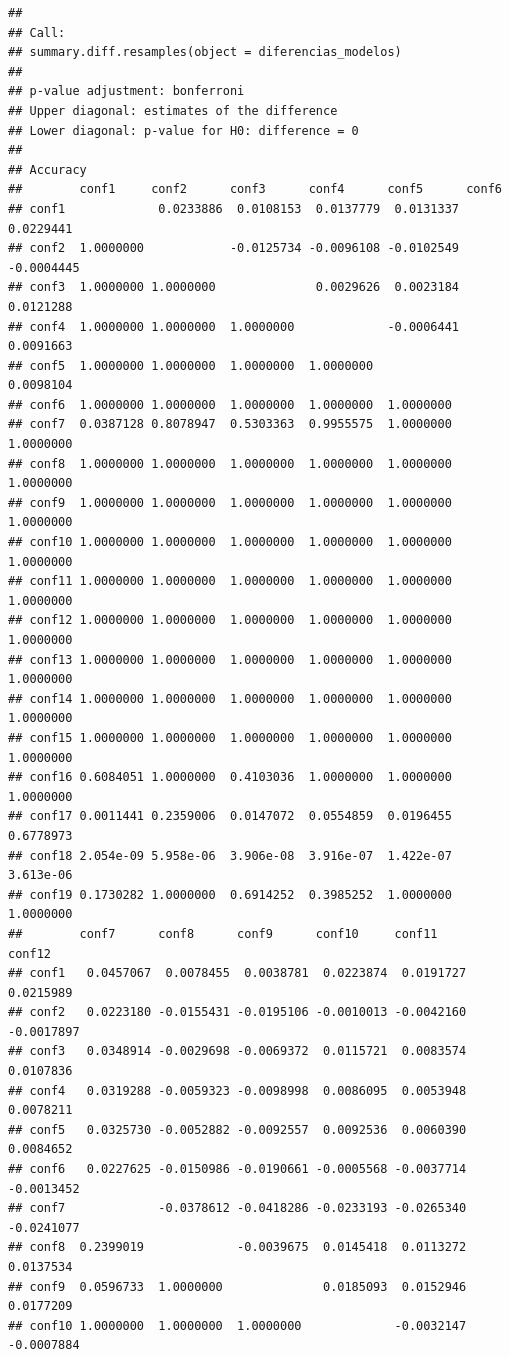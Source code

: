 \documentclass[
]{article}
\begin{document}
\begin{verbatim}
## 
## Call:
## summary.diff.resamples(object = diferencias_modelos)
## 
## p-value adjustment: bonferroni 
## Upper diagonal: estimates of the difference
## Lower diagonal: p-value for H0: difference = 0
## 
## Accuracy 
##        conf1     conf2      conf3      conf4      conf5      conf6     
## conf1             0.0233886  0.0108153  0.0137779  0.0131337  0.0229441
## conf2  1.0000000            -0.0125734 -0.0096108 -0.0102549 -0.0004445
## conf3  1.0000000 1.0000000              0.0029626  0.0023184  0.0121288
## conf4  1.0000000 1.0000000  1.0000000             -0.0006441  0.0091663
## conf5  1.0000000 1.0000000  1.0000000  1.0000000              0.0098104
## conf6  1.0000000 1.0000000  1.0000000  1.0000000  1.0000000            
## conf7  0.0387128 0.8078947  0.5303363  0.9955575  1.0000000  1.0000000 
## conf8  1.0000000 1.0000000  1.0000000  1.0000000  1.0000000  1.0000000 
## conf9  1.0000000 1.0000000  1.0000000  1.0000000  1.0000000  1.0000000 
## conf10 1.0000000 1.0000000  1.0000000  1.0000000  1.0000000  1.0000000 
## conf11 1.0000000 1.0000000  1.0000000  1.0000000  1.0000000  1.0000000 
## conf12 1.0000000 1.0000000  1.0000000  1.0000000  1.0000000  1.0000000 
## conf13 1.0000000 1.0000000  1.0000000  1.0000000  1.0000000  1.0000000 
## conf14 1.0000000 1.0000000  1.0000000  1.0000000  1.0000000  1.0000000 
## conf15 1.0000000 1.0000000  1.0000000  1.0000000  1.0000000  1.0000000 
## conf16 0.6084051 1.0000000  0.4103036  1.0000000  1.0000000  1.0000000 
## conf17 0.0011441 0.2359006  0.0147072  0.0554859  0.0196455  0.6778973 
## conf18 2.054e-09 5.958e-06  3.906e-08  3.916e-07  1.422e-07  3.613e-06 
## conf19 0.1730282 1.0000000  0.6914252  0.3985252  1.0000000  1.0000000 
##        conf7      conf8      conf9      conf10     conf11     conf12    
## conf1   0.0457067  0.0078455  0.0038781  0.0223874  0.0191727  0.0215989
## conf2   0.0223180 -0.0155431 -0.0195106 -0.0010013 -0.0042160 -0.0017897
## conf3   0.0348914 -0.0029698 -0.0069372  0.0115721  0.0083574  0.0107836
## conf4   0.0319288 -0.0059323 -0.0098998  0.0086095  0.0053948  0.0078211
## conf5   0.0325730 -0.0052882 -0.0092557  0.0092536  0.0060390  0.0084652
## conf6   0.0227625 -0.0150986 -0.0190661 -0.0005568 -0.0037714 -0.0013452
## conf7             -0.0378612 -0.0418286 -0.0233193 -0.0265340 -0.0241077
## conf8  0.2399019             -0.0039675  0.0145418  0.0113272  0.0137534
## conf9  0.0596733  1.0000000              0.0185093  0.0152946  0.0177209
## conf10 1.0000000  1.0000000  1.0000000             -0.0032147 -0.0007884

\end{verbatim}
\end{document}
